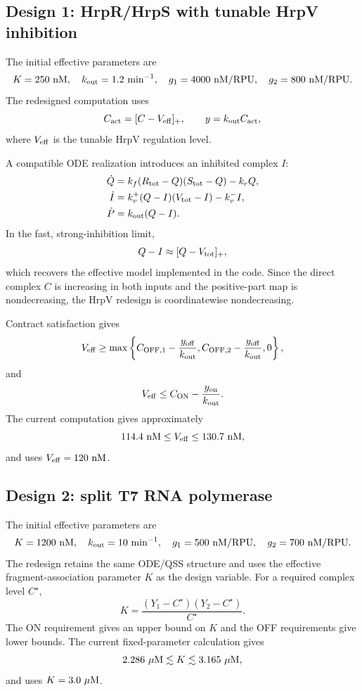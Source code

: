 \subsection{Design 1: HrpR/HrpS with tunable HrpV inhibition}

The initial effective parameters are
\[
K=250~{\rm nM},\quad k_{\rm out}=1.2~{\rm min}^{-1},\quad
g_1=4000~{\rm nM/RPU},\quad g_2=800~{\rm nM/RPU}.
\]
The redesigned computation uses
\[
C_{\rm act}=[C-V_{\rm eff}]_+,\qquad
y=k_{\rm out}C_{\rm act},
\]
where $V_{\rm eff}$ is the tunable HrpV regulation level.

A compatible ODE realization introduces an inhibited complex $I$:
\begin{align}
\dot Q&=k_f(R_{\rm tot}-Q)(S_{\rm tot}-Q)-k_rQ,\\
\dot I&=k_v^+(Q-I)(V_{\rm tot}-I)-k_v^-I,\\
\dot P&=k_{\rm out}(Q-I).
\end{align}
In the fast, strong-inhibition limit,
\[
Q-I\approx[Q-V_{\rm tot}]_+,
\]
which recovers the effective model implemented in the code. Since the direct
complex $C$ is increasing in both inputs and the positive-part map is
nondecreasing, the HrpV redesign is coordinatewise nondecreasing.

Contract satisfaction gives
\[
V_{\rm eff}\ge
\max\left\{
C_{\rm OFF,1}-\frac{y_{\rm off}}{k_{\rm out}},
C_{\rm OFF,2}-\frac{y_{\rm off}}{k_{\rm out}},0
\right\},
\]
and
\[
V_{\rm eff}\le
C_{\rm ON}-\frac{y_{\rm on}}{k_{\rm out}}.
\]
The current computation gives approximately
\[
114.4~{\rm nM}\le V_{\rm eff}\le130.7~{\rm nM},
\]
and uses $V_{\rm eff}=120~{\rm nM}$.

\subsection{Design 2: split T7 RNA polymerase}

The initial effective parameters are
\[
K=1200~{\rm nM},\quad k_{\rm out}=10~{\rm min}^{-1},\quad
g_1=500~{\rm nM/RPU},\quad g_2=700~{\rm nM/RPU}.
\]
The redesign retains the same ODE/QSS structure and uses the effective
fragment-association parameter $K$ as the design variable. For a required
complex level $C^\star$,
\[
K=\frac{(Y_1-C^\star)(Y_2-C^\star)}{C^\star}.
\]
The ON requirement gives an upper bound on $K$ and the OFF requirements give
lower bounds. The current fixed-parameter calculation gives
\[
2.286~\mu{\rm M}\lesssim K\lesssim3.165~\mu{\rm M},
\]
and uses $K=3.0~\mu{\rm M}$.

